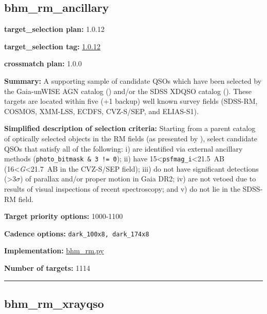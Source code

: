 \hypertarget{bhm_rm_ancillary_plan1.0.12}{%
\subsection{bhm\_rm\_ancillary}\label{bhm_rm_ancillary_plan1.0.12}}

\noindent\textbf{target\_selection plan:} 1.0.12

\noindent\textbf{target\_selection tag:}
\href{https://github.com/sdss/target_selection/tree/1.0.12/}{1.0.12}

\noindent\textbf{crossmatch plan:} 1.0.0

\noindent\textbf{Summary:} A supporting sample of candidate QSOs which have been
selected by the Gaia-unWISE AGN catalog
(\citealt{Shu2019}) and/or the SDSS XDQSO catalog
(\citealt{Bovy2011}). These targets are located within five (+1 backup) well
known survey fields (SDSS-RM, COSMOS, XMM-LSS, ECDFS, CVZ-S/SEP, and
ELIAS-S1).

\noindent\textbf{Simplified description of selection criteria:} Starting from a
parent catalog of optically selected objects in the RM fields (as
presented by
\citealt{Yang2022}), select candidate QSOs that satisfy all of the
following: i) are identified via external ancillary methods
(\texttt{photo\_bitmask\ \&\ 3\ !=\ 0}); ii) have
15\textless{}\texttt{psfmag\_i}\textless21.5~AB
(16\textless{}\emph{G}\textless21.7~AB in the CVZ-S/SEP field); iii) do
not have significant detections (\textgreater3$\sigma$) of parallax and/or
proper motion in Gaia DR2; iv) are not vetoed due to results of visual
inspections of recent spectroscopy; and v) do not lie in the SDSS-RM
field.


\noindent\textbf{Target priority options:} 1000-1100

\noindent\textbf{Cadence options:} \texttt{dark\_100x8,\ dark\_174x8}

\noindent\textbf{Implementation:}
\href{https://github.com/sdss/target_selection/blob/1.0.12/python/target_selection/cartons/bhm_rm.py}{bhm\_rm.py}

\noindent\textbf{Number of targets:} 1114

\begin{center}\rule{0.5\linewidth}{0.5pt}\end{center}

\hypertarget{bhm_rm_xrayqso_plan1.0.12}{%
\subsection{bhm\_rm\_xrayqso}\label{bhm_rm_xrayqso_plan1.0.12}}

